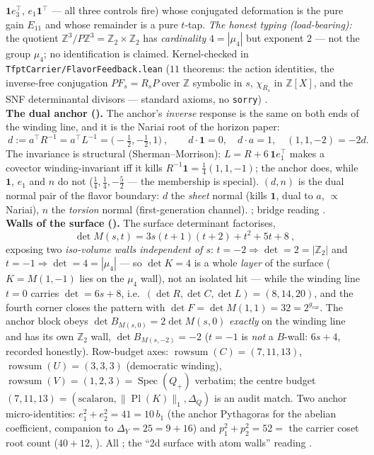 \documentclass[11pt,a4paper]{article}
\newcommand{\gcar}{g_{\mathrm{car}}}
\newcommand{\Z}{\mathbb{Z}}
\theoremstyle{definition}
\begin{document}
\begin{winbox}
$\mathbf 1 e_3^{\!\top}$, $e_1\mathbf 1^{\!\top}$ --- all three controls fire) whose conjugated
deformation is the pure gain $E_{11}$ and whose remainder is a pure $t$-tap.  \emph{The honest typing
(load-bearing):} the quotient $\Z^3/P\Z^3 = \Z_2\times\Z_2$ has \emph{cardinality} $4 = |\mu_4|$ but
exponent $2$ --- not the group $\mu_4$; no identification is claimed.  Kernel-checked in
\texttt{TfptCarrier/FlavorFeedback.lean} ($11$ theorems: the action identities, the inverse-free
conjugation $P F_s = R_s P$ over $\Z$ symbolic in $s$, $\chi_{R_s}$ in $\Z[X]$, and the SNF
determinantal divisors --- standard axioms, no \texttt{sorry}) \mE.
\smallskip\\
\noindent\textbf{The dual anchor ().} The anchor's \emph{inverse} response is the
same on both ends of the winding line, and it is the Nariai root of the horizon paper:
\[
  \boxed{\ d:=a^\top R^{-1}=a^\top L^{-1}=\bigl(-\tfrac12,-\tfrac12,1\bigr)\ },\qquad
  d\cdot\mathbf 1=0,\quad d\cdot a=1,\quad (1,1,-2)=-2d .
\]
The invariance is structural (Sherman--Morrison): $L=R+6\,\mathbf 1e_1^\top$ makes a covector
winding-invariant iff it kills $R^{-1}\mathbf 1=\tfrac14(1,1,-1)$; the anchor does, while $\mathbf 1$,
$e_1$ and $n$ do not ($\tfrac14,\tfrac14,-\tfrac52$ --- the membership is special). $(d,n)$ is the dual
normal pair of the flavor boundary: $d$ the \emph{sheet} normal (kills $\mathbf 1$, dual to $a$,
$\propto$ Nariai), $n$ the \emph{torsion} normal (first-generation channel). \mE; bridge reading \mC.
\smallskip\\
\noindent\textbf{Walls of the surface ().} The surface determinant factorises,
\[
  \boxed{\ \det M(s,t)=3s(t{+}1)(t{+}2)+t^2+5t+8\ },
\]
exposing two \emph{iso-volume walls independent of $s$}: $t=-2\Rightarrow\det=2=|\Z_2|$ and
$t=-1\Rightarrow\det=4=|\mu_4|$ --- so $\det K=4$ is a whole \emph{layer} of the surface ($K=M(1,-1)$ lies
on the $\mu_4$ wall), not an isolated hit --- while the winding line $t=0$ carries $\det=6s+8$, i.e.\
$(\det R,\det C,\det L)=(8,14,20)$, and the fourth corner closes the pattern with
$\det F=\det M(1,1)=32=2^{\gcar}$. The anchor block obeys $\det B_{M(s,0)}=2\det M(s,0)$ \emph{exactly} on
the winding line and has its own $\Z_2$ wall, $\det B_{M(s,-2)}=-2$ ($t=-1$ is \emph{not} a $B$-wall:
$6s+4$, recorded honestly). Row-budget axes: $\operatorname{rowsum}(C)=(7,11,13)$,
$\operatorname{rowsum}(U)=(3,3,3)$ (democratic winding), $\operatorname{rowsum}(V)=(1,2,3)=
\operatorname{Spec}(Q_+)$ verbatim; the centre budget $(7,11,13)=(\text{scalaron},\|\operatorname{Pl}(K)\|_1,
\Delta_Q)$ is an audit match. Two anchor micro-identities: $e_1^2+e_2^2=41=10\,b_1$ (the anchor Pythagoras
for the abelian coefficient, companion to $\Delta_Y=25=9{+}16$) and $p_1^2+p_2^2=52=$ the carrier coset
root count ($40{+}12$, \veri{v128\_graded\_hull.py}). All \mE; the ``2d surface with atom walls'' reading \mC.
\end{winbox}
\end{document}
